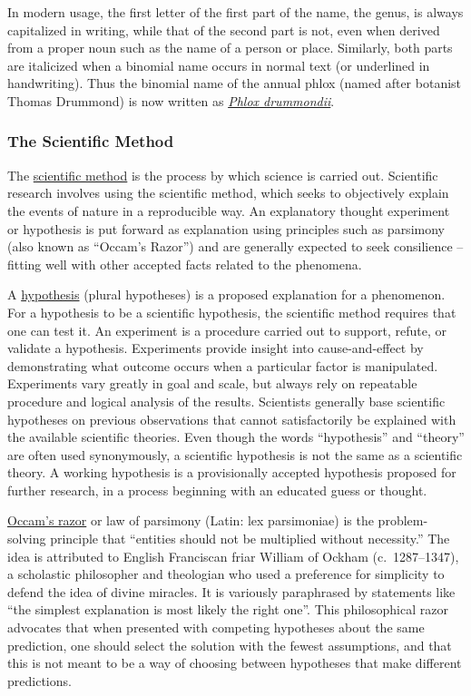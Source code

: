 \documentclass[
]{article}
\begin{document}
In modern usage, the first letter of the first part of the name, the
genus, is always capitalized in writing, while that of the second part
is not, even when derived from a proper noun such as the name of a
person or place. Similarly, both parts are italicized when a binomial
name occurs in normal text (or underlined in handwriting). Thus the
binomial name of the annual phlox (named after botanist Thomas Drummond)
is now written as
\href{https://en.wikipedia.org/wiki/Phlox_drummondii}{\emph{Phlox
drummondii}}.

\hypertarget{the-scientific-method}{%
\subsubsection{The Scientific Method}\label{the-scientific-method}}

The \href{https://en.wikipedia.org/wiki/Scientific_method}{scientific
method} is the process by which science is carried out. Scientific
research involves using the scientific method, which seeks to
objectively explain the events of nature in a reproducible way. An
explanatory thought experiment or hypothesis is put forward as
explanation using principles such as parsimony (also known as ``Occam's
Razor'') and are generally expected to seek consilience -- fitting well
with other accepted facts related to the phenomena.

A \href{https://en.wikipedia.org/wiki/Hypothesis}{hypothesis} (plural
hypotheses) is a proposed explanation for a phenomenon. For a hypothesis
to be a scientific hypothesis, the scientific method requires that one
can test it. An experiment is a procedure carried out to support,
refute, or validate a hypothesis. Experiments provide insight into
cause-and-effect by demonstrating what outcome occurs when a particular
factor is manipulated. Experiments vary greatly in goal and scale, but
always rely on repeatable procedure and logical analysis of the results.
Scientists generally base scientific hypotheses on previous observations
that cannot satisfactorily be explained with the available scientific
theories. Even though the words ``hypothesis'' and ``theory'' are often
used synonymously, a scientific hypothesis is not the same as a
scientific theory. A working hypothesis is a provisionally accepted
hypothesis proposed for further research, in a process beginning with an
educated guess or thought.

\href{https://en.wikipedia.org/wiki/Occam\%27s_razor}{Occam's razor} or
law of parsimony (Latin: lex parsimoniae) is the problem-solving
principle that ``entities should not be multiplied without necessity.''
The idea is attributed to English Franciscan friar William of Ockham
(c.~1287--1347), a scholastic philosopher and theologian who used a
preference for simplicity to defend the idea of divine miracles. It is
variously paraphrased by statements like ``the simplest explanation is
most likely the right one''. This philosophical razor advocates that
when presented with competing hypotheses about the same prediction, one
should select the solution with the fewest assumptions, and that this is
not meant to be a way of choosing between hypotheses that make different
predictions.
\end{document}
